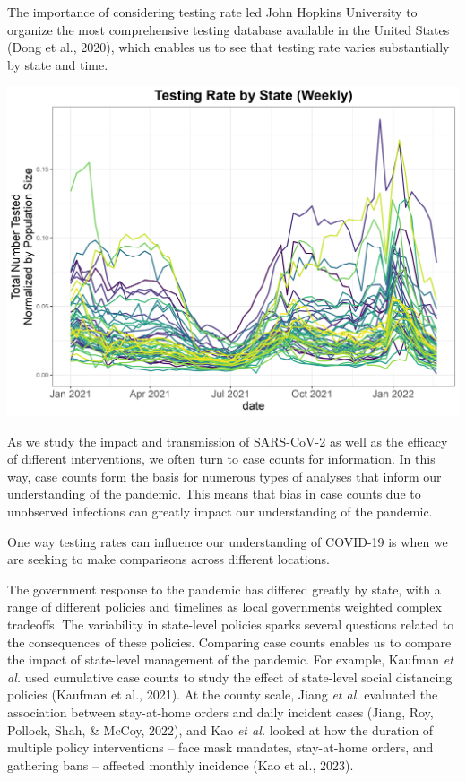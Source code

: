 \documentclass[12pt,twoside]{smiththesis}
\begin{document}
The importance of considering testing rate led John Hopkins University to organize the most comprehensive testing database available in the United States (Dong et al., 2020), which enables us to see that testing rate varies substantially by state and time.

\includegraphics[width=0.9\linewidth]{./figure/testing_rate}

As we study the impact and transmission of SARS-CoV-2 as well as the efficacy of different interventions, we often turn to case counts for information. In this way, case counts form the basis for numerous types of analyses that inform our understanding of the pandemic. This means that bias in case counts due to unobserved infections can greatly impact our understanding of the pandemic.

One way testing rates can influence our understanding of COVID-19 is when we are seeking to make comparisons across different locations.

The government response to the pandemic has differed greatly by state, with a range of different policies and timelines as local governments weighted complex tradeoffs. The variability in state-level policies sparks several questions related to the consequences of these policies. Comparing case counts enables us to compare the impact of state-level management of the pandemic. For example, Kaufman \emph{et al.} used cumulative case counts to study the effect of state-level social distancing policies (Kaufman et al., 2021). At the county scale, Jiang \emph{et al.} evaluated the association between stay-at-home orders and daily incident cases (Jiang, Roy, Pollock, Shah, \& McCoy, 2022), and Kao \emph{et al.} looked at how the duration of multiple policy interventions -- face mask mandates, stay-at-home orders, and gathering bans -- affected monthly incidence (Kao et al., 2023).
\end{document}
